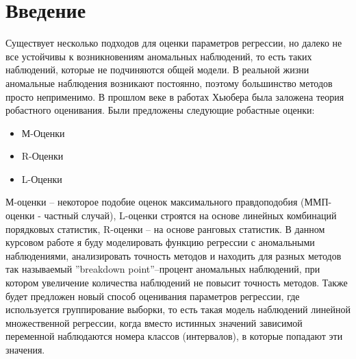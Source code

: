\documentclass[12pt]{article}
\begin{document}
\section{Введение}
Существует несколько подходов для оценки параметров регрессии, но далеко не все устойчивы к возникновениям аномальных наблюдений, 
то есть таких наблюдений, которые не подчиняются общей модели. 
В реальной жизни аномальные наблюдения возникают постоянно, поэтому большинство методов просто неприменимо.
В прошлом веке в работах Хьюбера была заложена теория робастного оценивания.\hfill\break
Были предложены следующие робастные оценки\cite{Huber}:
\begin{itemize}
    \item М-Оценки
    \item R-Оценки
    \item L-Оценки
\end{itemize}
М-оценки -- некоторое подобие оценок максимального правдоподобия (ММП-оценки - частный случай), L-оценки строятся на основе линейных комбинаций порядковых статистик, R-оценки -- на основе ранговых статистик.
В данном курсовом работе я буду моделировать функцию регрессии с аномальными наблюдениями, анализировать точность методов и находить для разных методов так называемый ''breakdown point''--процент аномальных наблюдений, при котором увеличение количества наблюдений не повысит точность методов.\hfill\break
Также будет предложен новый способ оценивания параметров регрессии, где используется группирование выборки, 
то есть такая модель наблюдений линейной множественной регрессии, когда вместо истинных значений зависимой переменной наблюдаются номера классов (интервалов), в которые попадают эти значения\cite{OLSforGrouping}.
\newpage
\end{document}
